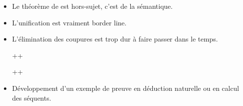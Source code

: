 \documentclass{agregfiche}
\begin{document}
\secdev

\begin{itemize}
\item Le théorème de  est hors-sujet, c'est de la sémantique.
\item L'unification est vraiment border line.
\item L'élimination des coupures est trop dur à faire passer dans le temps.
\item[++] 
\item[++] 
\item Développement d'un exemple de preuve en déduction naturelle ou en calcul des séquents.
\end{itemize}
\end{document}

